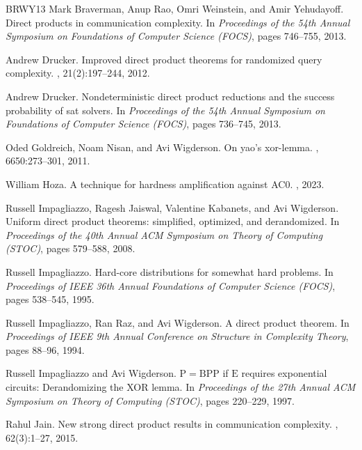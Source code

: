 \documentclass[11pt]{article}
\begin{document}
\begin{thebibliography}{BRWY13}
Mark Braverman, Anup Rao, Omri Weinstein, and Amir Yehudayoff.
\newblock Direct products in communication complexity.
\newblock In {\em Proceedings of the 54th Annual Symposium on Foundations of
  Computer Science (FOCS)}, pages 746--755, 2013.

Andrew Drucker.
\newblock Improved direct product theorems for randomized query complexity.
, 21(2):197--244, 2012.

Andrew Drucker.
\newblock Nondeterministic direct product reductions and the success
  probability of sat solvers.
\newblock In {\em Proceedings of the 54th Annual Symposium on Foundations of
  Computer Science (FOCS)}, pages 736--745, 2013.

Oded Goldreich, Noam Nisan, and Avi Wigderson.
\newblock On yao's xor-lemma.
, 6650:273--301, 2011.

William Hoza.
\newblock A technique for hardness amplification against {AC0}.
, 2023.

Russell Impagliazzo, Ragesh Jaiswal, Valentine Kabanets, and Avi Wigderson.
\newblock Uniform direct product theorems: simplified, optimized, and
  derandomized.
\newblock In {\em Proceedings of the 40th Annual ACM Symposium on Theory of
  Computing (STOC)}, pages 579--588, 2008.

Russell Impagliazzo.
\newblock Hard-core distributions for somewhat hard problems.
\newblock In {\em Proceedings of IEEE 36th Annual Foundations of Computer
  Science (FOCS)}, pages 538--545, 1995.

Russell Impagliazzo, Ran Raz, and Avi Wigderson.
\newblock A direct product theorem.
\newblock In {\em Proceedings of IEEE 9th Annual Conference on Structure in
  Complexity Theory}, pages 88--96, 1994.

Russell Impagliazzo and Avi Wigderson.
\newblock $\mathrm{P}= \mathrm{BPP}$ if $\mathrm{E}$ requires exponential
  circuits: Derandomizing the {XOR} lemma.
\newblock In {\em Proceedings of the 27th Annual ACM Symposium on Theory of
  Computing (STOC)}, pages 220--229, 1997.

Rahul Jain.
\newblock New strong direct product results in communication complexity.
, 62(3):1--27, 2015.


\end{thebibliography}
\end{document}
